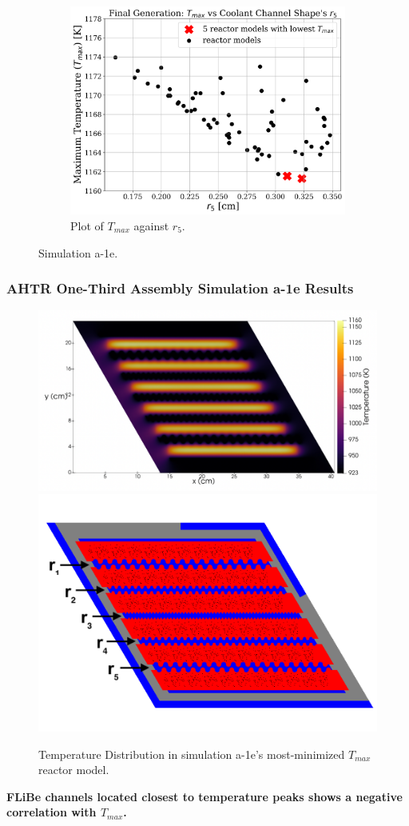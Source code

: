 \begin{frame}
\begin{figure}
        \begin{subfigure}{0.3\textwidth}
            \includegraphics[width=\linewidth]{../docs/figures/a-1e-r5.png}
            \caption{Plot of $T_{max}$ against $r_5$.}
            \label{fig:a-1e-r5} 
        \end{subfigure}
        \caption{Simulation a-1e.}
    \end{figure}
\end{frame}

\begin{frame}
    \frametitle{AHTR One-Third Assembly Simulation a-1e Results}
    \begin{figure}
        \includegraphics[width=0.55\linewidth]{../docs/figures/a-1e-temp-distribution-2d.png} 
        \includegraphics[width=0.4\linewidth]{../docs/figures/coolant-channel-shape-assem.png} 
        \caption{Temperature Distribution in simulation a-1e's most-minimized $T_{max}$ reactor 
        model.}
    \end{figure}
    \begin{tcolorbox}[colback=white,colframe=illiniorange,title=Major Takeaway]
    \textbf{FLiBe channels located closest to temperature peaks shows a negative 
    correlation with $T_{max}$.}
    \end{tcolorbox}
\end{frame}

